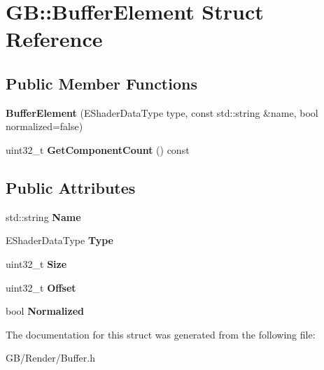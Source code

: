 \hypertarget{struct_g_b_1_1_buffer_element}{}\section{GB\+::Buffer\+Element Struct Reference}
\label{struct_g_b_1_1_buffer_element}
\subsection*{Public Member Functions}
\begin{DoxyCompactItemize}
\item 
\mbox{\label{struct_g_b_1_1_buffer_element_a941638503ec3ded7729de5a3c9519df1}} 
{\bfseries Buffer\+Element} (E\+Shader\+Data\+Type type, const std\+::string \&name, bool normalized=false)
\item 
\mbox{\label{struct_g_b_1_1_buffer_element_a81825021c36efbbbc02a2dd055b192ed}} 
uint32\+\_\+t {\bfseries Get\+Component\+Count} () const
\end{DoxyCompactItemize}
\subsection*{Public Attributes}
\begin{DoxyCompactItemize}
\item 
\mbox{\label{struct_g_b_1_1_buffer_element_a089b306ba80ce382b82546a12042ab3c}} 
std\+::string {\bfseries Name}
\item 
\mbox{\label{struct_g_b_1_1_buffer_element_a4806f7aea104de54e79d82e58b1c9a4a}} 
E\+Shader\+Data\+Type {\bfseries Type}
\item 
\mbox{\label{struct_g_b_1_1_buffer_element_a2029e33ca9fc397e37ca079e21a55610}} 
uint32\+\_\+t {\bfseries Size}
\item 
\mbox{\label{struct_g_b_1_1_buffer_element_a7398579eae403bdb538cabb3f1c34e5b}} 
uint32\+\_\+t {\bfseries Offset}
\item 
\mbox{\label{struct_g_b_1_1_buffer_element_a7083650a180c7b64e02088e25bc10f62}} 
bool {\bfseries Normalized}
\end{DoxyCompactItemize}


The documentation for this struct was generated from the following file\+:\begin{DoxyCompactItemize}
\item 
G\+B/\+Render/Buffer.\+h\end{DoxyCompactItemize}
